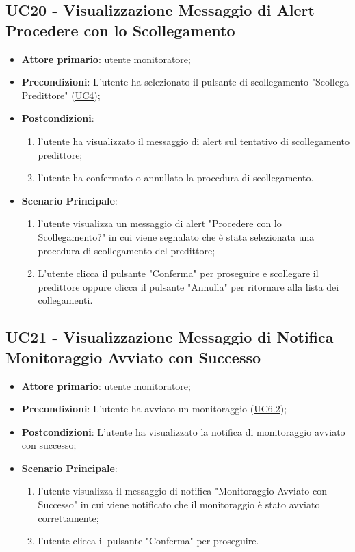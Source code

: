 	\subsection{UC20 - Visualizzazione Messaggio di Alert Procedere con lo Scollegamento}
		\begin{itemize}
			\item\textbf{Attore primario}: utente monitoratore;
			\item\textbf{Precondizioni}: L’utente ha selezionato il pulsante di scollegamento "Scollega Predittore" (\hyperref[par:UC4]{UC4});
			\item\textbf{Postcondizioni}:
				\begin{enumerate}
					\item l'utente ha visualizzato il messaggio di alert sul tentativo di scollegamento predittore;
					\item l'utente ha confermato o annullato la procedura di scollegamento. 
				\end{enumerate}
			\item\textbf{Scenario Principale}: 
				\begin{enumerate} 
					\item l’utente visualizza un messaggio di alert "Procedere con lo Scollegamento?" in cui viene segnalato che è stata selezionata una procedura di scollegamento del predittore;
					\item L'utente clicca il pulsante "Conferma" per proseguire e scollegare il predittore oppure clicca il pulsante "Annulla" per ritornare alla lista dei collegamenti.
				\end{enumerate}
		\end{itemize}	


	\label{par:UC21}
	\subsection{UC21 - Visualizzazione Messaggio di Notifica Monitoraggio Avviato con Successo}	
		\begin{itemize}
			\item\textbf{Attore primario}: utente monitoratore;
			\item\textbf{Precondizioni}: L’utente ha avviato un monitoraggio (\hyperref[par:UC6.2]{UC6.2});
			\item\textbf{Postcondizioni}: L’utente ha visualizzato la notifica di monitoraggio avviato con successo; 
			\item\textbf{Scenario Principale}: 
				\begin{enumerate} 
					\item l’utente visualizza il messaggio di notifica "Monitoraggio Avviato con Successo" in cui viene notificato che il monitoraggio è stato avviato correttamente;
					\item l'utente clicca il pulsante "Conferma" per proseguire.		
				\end{enumerate}		
		\end{itemize}

